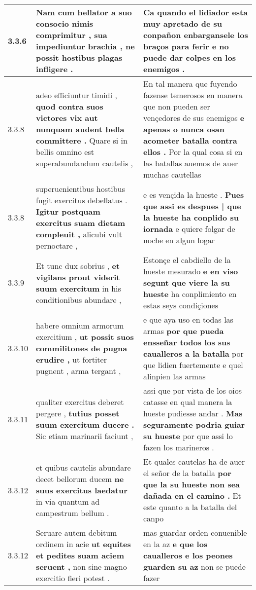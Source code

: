 \begin{tabular}{|p{1cm}|p{6.5cm}|p{6.5cm}|}
3.3.6 & Nam cum bellator a suo consocio nimis comprimitur , \textbf{ sua impediuntur brachia , } ne possit hostibus plagas infligere . & Ca quando el lidiador esta muy apretado de su conpañon \textbf{ enbargansele los braços para ferir } e no puede dar colpes en los enemigos . \\\hline
3.3.8 & adeo efficiuntur timidi , \textbf{ quod contra suos victores vix aut nunquam audent bella committere . } Quare si in bellis omnino est superabundandum cautelis , & En tal manera que fuyendo fazense temerosos en manera que non pueden ser vençedores de sus enemigos \textbf{ e apenas o nunca osan acometer batalla contra ellos . } Por la qual cosa si en las batallas auemos de auer muchas cautellas \\\hline
3.3.8 & superuenientibus hostibus fugit exercitus debellatus . \textbf{ Igitur postquam exercitus suam dietam compleuit , } alicubi vult pernoctare , & e es vençida la hueste . \textbf{ Pues que assi es despues | que la hueste ha conplido su iornada } e quiere folgar de noche en algun logar \\\hline
3.3.9 & Et tunc dux sobrius , \textbf{ et vigilans prout viderit suum exercitum } in his conditionibus abundare , & Estonçe el cabdiello de la hueste mesurado \textbf{ e en viso segunt que viere la su hueste } ha conplimiento en estas seys condiçiones \\\hline
3.3.10 & habere omnium armorum exercitium , \textbf{ ut possit suos commilitones de pugna erudire , } ut fortiter pugnent , arma tergant , & e que aya uso en todas las armas \textbf{ por que pueda ensseñar todos los sus caualleros a la batalla } por que lidien fuertemente e quel alinpien las armas \\\hline
3.3.11 & qualiter exercitus deberet pergere , \textbf{ tutius posset suum exercitum ducere . } Sic etiam marinarii faciunt , & assi que por vista de los oios catasse en qual manera la hueste pudiesse andar . \textbf{ Mas seguramente podria guiar su hueste } por que assi lo fazen los marineros . \\\hline
3.3.12 & et quibus cautelis abundare decet bellorum ducem \textbf{ ne suus exercitus laedatur } in via quantum ad campestrum bellum . & Et quales cautelas ha de auer el señor de la batalla \textbf{ por que la su hueste non sea dañada en el camino . } Et este quanto a la batalla del canpo \\\hline
3.3.12 & Seruare autem debitum ordinem in acie \textbf{ ut equites et pedites suam aciem seruent , } non sine magno exercitio fieri potest . & mas guardar orden conuenible en la az \textbf{ e que los caualleros e los peones guarden su az } non se puede fazer \\\hline

\end{tabular}
